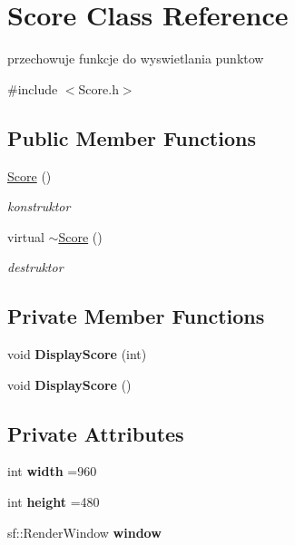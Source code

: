 \hypertarget{class_score}{}\section{Score Class Reference}
\label{class_score}


przechowuje funkcje do wyswietlania punktow  




{\ttfamily \#include $<$Score.\+h$>$}

\subsection*{Public Member Functions}
\begin{DoxyCompactItemize}
\item 
\mbox{\label{class_score_a039c99843551e5e4b512ecee99e46617}} 
\mbox{\hyperlink{class_score_a039c99843551e5e4b512ecee99e46617}{Score}} ()
\begin{DoxyCompactList}\small\item\em konstruktor \end{DoxyCompactList}\item 
\mbox{\label{class_score_aeec7196d9a8115114e10a7368c5e4257}} 
virtual \mbox{\hyperlink{class_score_aeec7196d9a8115114e10a7368c5e4257}{$\sim$\+Score}} ()
\begin{DoxyCompactList}\small\item\em destruktor \end{DoxyCompactList}\end{DoxyCompactItemize}
\subsection*{Private Member Functions}
\begin{DoxyCompactItemize}
\item 
\mbox{\label{class_score_a376453a33e05f5a61af3e971161fb216}} 
void {\bfseries Display\+Score} (int)
\item 
\mbox{\label{class_score_a4e67443bf728b5d91d17fedeb45dc546}} 
void {\bfseries Display\+Score} ()
\end{DoxyCompactItemize}
\subsection*{Private Attributes}
\begin{DoxyCompactItemize}
\item 
\mbox{\label{class_score_a26870adfaa588ef44c4b1809d4056709}} 
int {\bfseries width} =960
\item 
\mbox{\label{class_score_a63f66090865ff2d49645d08af409fe9b}} 
int {\bfseries height} =480
\item 
\mbox{\label{class_score_aa2b718aa6f38eac54184ce50d8e4b860}} 
sf\+::\+Render\+Window {\bfseries window}
\end{DoxyCompactItemize}
